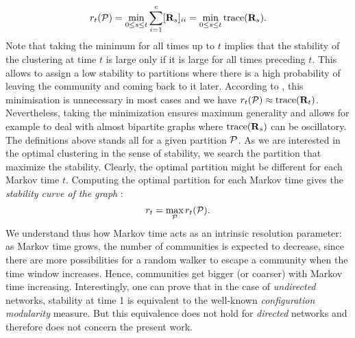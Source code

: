 \begin{equation}
	r_t(\P) = \min_{0 \le s \le t} \sum_{i = 1}^{c} [\b R_s]_{ii} = \min_{0 \le s \le t} \trace(\b R_s).
\end{equation}
Note that taking the minimum for all times up to $t$ implies that the stability of the clustering at time $t$ is large only if it is large for all times preceding $t$. This allows to assign a low stability to partitions where there is a high probability of leaving the community and coming back to it later. According to \cite{delvenne2013stability}, this minimisation is unnecessary in most cases and we have $r_t(\P) \approx \trace(\b R_t)$. Nevertheless, taking the minimization ensures maximum generality and allows for example to deal with almost bipartite graphs where $\trace(\b R_s)$ can be oscillatory.
The definitions above stands all for a given partition $\P$. As we are interested in the optimal clustering in the sense of stability, we search the partition that maximize the stability. Clearly, the optimal partition might be different for each Markov time $t$. Computing the optimal partition for each Markov time gives the \textit{stability curve of the graph} :
\begin{equation}
	r_t = \max_{\P} r_t(\P).
\end{equation}
We understand thus how Markov time acts as an intrinsic resolution parameter: as Markov time grows, the number of communities is expected to decrease, since there are more possibilities for a random walker to escape a community when the time window increases. Hence, communities get bigger (or coarser) with Markov time increasing. Interestingly, one can prove that in the case of \textit{undirected} networks, stability at time 1 is equivalent to the well-known \textit{configuration modularity} measure. But this equivalence does not hold for \textit{directed} networks and therefore does not concern the present work.

